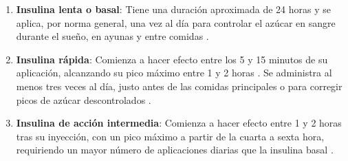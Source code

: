 \begin{enumerate}
    \item \textbf{Insulina lenta o basal}: Tiene una duración aproximada de 24 horas y se aplica, por norma general, una vez al día para controlar el azúcar en sangre durante el sueño, en ayunas y entre comidas \cite{ada_standards}.
    \item \textbf{Insulina rápida}: Comienza a hacer efecto entre los 5 y 15 minutos de su aplicación, alcanzando su pico máximo entre 1 y 2 horas \cite{ada_standards}. Se administra al menos tres veces al día, justo antes de las comidas principales o para corregir picos de azúcar descontrolados \cite{ada_standards}.
    \item \textbf{Insulina de acción intermedia}: Comienza a hacer efecto entre 1 y 2 horas tras su inyección, con un pico máximo a partir de la cuarta a sexta hora, requiriendo un mayor número de aplicaciones diarias que la insulina basal \cite{ada_standards}.
\end{enumerate}